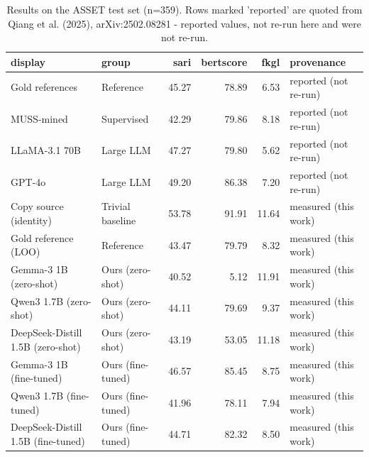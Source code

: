 \begin{table}
\caption{Results on the ASSET test set (n=359). Rows marked 'reported' are quoted from Qiang et al. (2025), arXiv:2502.08281 - reported values, not re-run here and were not re-run.}
\label{tab:asset}
\begin{tabular}{llrrrl}
\toprule
display & group & sari & bertscore & fkgl & provenance \\
\midrule
Gold references & Reference & 45.27 & 78.89 & 6.53 & reported (not re-run) \\
MUSS-mined & Supervised & 42.29 & 79.86 & 8.18 & reported (not re-run) \\
LLaMA-3.1 70B & Large LLM & 47.27 & 79.80 & 5.62 & reported (not re-run) \\
GPT-4o & Large LLM & 49.20 & 86.38 & 7.20 & reported (not re-run) \\
Copy source (identity) & Trivial baseline & 53.78 & 91.91 & 11.64 & measured (this work) \\
Gold reference (LOO) & Reference & 43.47 & 79.79 & 8.32 & measured (this work) \\
Gemma-3 1B (zero-shot) & Ours (zero-shot) & 40.52 & 5.12 & 11.91 & measured (this work) \\
Qwen3 1.7B (zero-shot) & Ours (zero-shot) & 44.11 & 79.69 & 9.37 & measured (this work) \\
DeepSeek-Distill 1.5B (zero-shot) & Ours (zero-shot) & 43.19 & 53.05 & 11.18 & measured (this work) \\
Gemma-3 1B (fine-tuned) & Ours (fine-tuned) & 46.57 & 85.45 & 8.75 & measured (this work) \\
Qwen3 1.7B (fine-tuned) & Ours (fine-tuned) & 41.96 & 78.11 & 7.94 & measured (this work) \\
DeepSeek-Distill 1.5B (fine-tuned) & Ours (fine-tuned) & 44.71 & 82.32 & 8.50 & measured (this work) \\
\bottomrule
\end{tabular}
\end{table}
